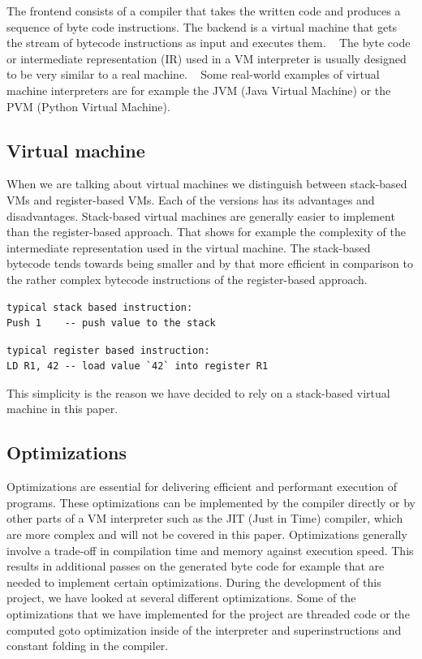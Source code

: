\documentclass{article}
\begin{document}
The frontend consists of a compiler that takes the written code and produces a
sequence of byte code instructions. The backend is a virtual machine that gets
the stream of bytecode instructions as input and executes them. ~\cite{vmgen}
The byte code or intermediate representation (IR) used in a VM interpreter is
usually designed to be very similar to a real machine. ~\cite{vmgen} Some
real-world examples of virtual machine interpreters are for example the JVM
(Java Virtual Machine) or the PVM (Python Virtual Machine).

\subsection{Virtual machine}
When we are talking about virtual machines we distinguish between stack-based
VMs and register-based VMs. Each of the versions has its advantages and
disadvantages. Stack-based virtual machines are generally easier to implement
than the register-based approach. That shows for example the complexity of the
intermediate representation used in the virtual machine. The stack-based
bytecode tends towards being smaller and by that more efficient in comparison
to the rather complex bytecode instructions of the register-based approach.

\begin{verbatim}
typical stack based instruction:
Push 1    -- push value to the stack
\end{verbatim}

\begin{verbatim}
typical register based instruction:
LD R1, 42 -- load value `42` into register R1
\end{verbatim}

This simplicity is the reason we have decided to rely on a stack-based virtual machine in
this paper.

\subsection{Optimizations}
Optimizations are essential for delivering efficient and performant execution of
programs. These optimizations can be implemented by the compiler directly or
by other parts of a VM interpreter such as the JIT (Just in Time) compiler, which
are more complex and will not be covered in this paper.
Optimizations generally involve a trade-off in compilation time and memory
against execution speed. This results in additional passes on the generated
byte code for example that are needed to implement certain optimizations.
During the development of this project, we have looked at several different
optimizations. Some of the optimizations that we have implemented for the
project are threaded code or the computed goto optimization inside of the
interpreter and superinstructions and constant folding in the compiler.
\end{document}
